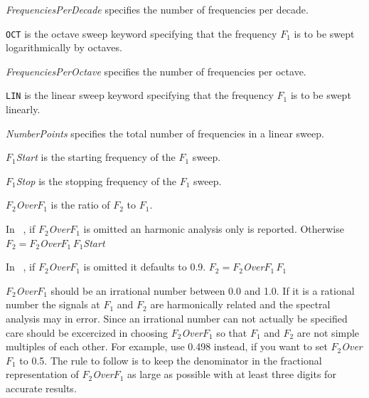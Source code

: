 {\begin{widelist}
\item[{\it FrequenciesPerDecade}]
      specifies the number of frequencies per decade.

\item[{\tt OCT}] is the octave sweep keyword specifying that the
     frequency $F_1$ is to be swept logarithmically by octaves.

\item[{\it FrequenciesPerOctave}]
      specifies the number of frequencies per octave.
\end{widelist}

\begin{widelist}

\item[{\tt LIN}] is the linear sweep keyword specifying that the frequency
     $F_1$ is to be swept linearly.

\item[{\it NumberPoints}]
      specifies the total number of frequencies in a linear sweep.

\item[{\it $F_1$Start}]
      is the starting frequency of the $F_1$ sweep.

\item[{\it $F_1$Stop}]
      is the stopping frequency of the $F_1$ sweep.

\item[{\it $F_2$Over$F_1$}]
      is the ratio of $F_2$ to $F_1$.

      In \spicethree\ , if  {\it $F_2$Over$F_1$} is omitted an harmonic
      analysis only is reported. Otherwise
      $F_2 = ${\it $F_2$Over$F_1\,F_1$Start}

      In \spicetwo\ , if {\it $F_2$Over$F_1$} is omitted it defaults to 0.9.
      $F_2 = ${\it $F_2$Over$F_1\,F_1$}

      {\it $F_2$Over$F_1$} should be an irrational number between 0.0 and
      1.0. If it is a rational number the signals at $F_1$ and $F_2$
      are harmonically related and the spectral analysis may in error.
      Since an irrational number can not actually be specified
      care should be excercized in choosing
      {\it $F_2$Over$F_1$} so that $F_1$ and $F_2$ are not simple multiples of
      each other.  For example, use 0.498 instead, if you want to set
      {\it $F_2$Over$F_1$} to 0.5.  The rule to follow is to keep
      the denominator in the fractional representation of {\it $F_2$Over$F_1$}
      as large as possible with at least three digits for accurate  results.
\end{widelist}


}
